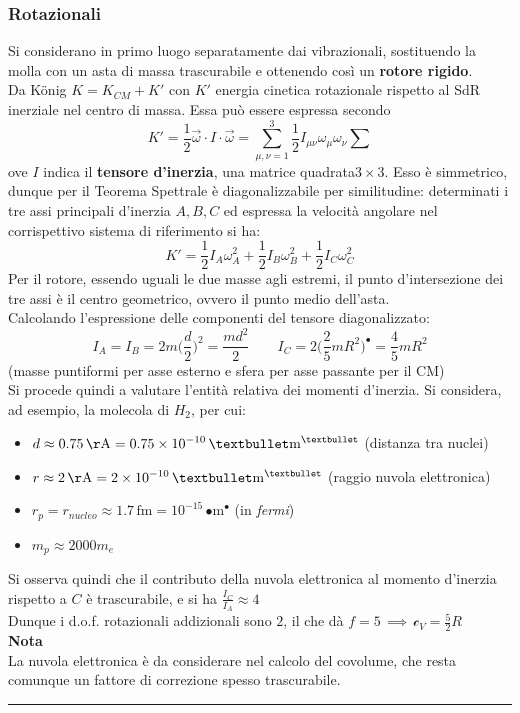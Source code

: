 \documentclass[10pt, oneside]{book}
\newcommand{\angstrom}{\, \mathrm{\AA}}
\newcommand{\meters}[2]{\, \mathrm{#2 m^{#1}}}
\newcommand{\infobox}[2]{\vspace{0.5cm}~\\ \textbf{#1} \hrulefill \vspace{0.2cm}\\#2 {}\,\\\hrule \vspace{0.5cm}}
\newcommand{\ds}{\displaystyle}
\newcommand{\molhtv}{\mathcal{c}_V }
\begin{document}
\subsubsection*{Rotazionali}
Si considerano in primo luogo separatamente dai vibrazionali, sostituendo la molla con un asta di massa trascurabile e ottenendo così un \textbf{rotore rigido}.\\
Da K\"onig $\ds K = K_{CM} + K'$ con $K'$ energia cinetica rotazionale rispetto al SdR inerziale nel centro di massa. Essa può essere espressa secondo
\[K' = \frac{1}{2} \vec{\omega} \cdot I \cdot \vec{\omega} = \sum\limits_{\mu, \nu =1}^3 \frac{1}{2} I_{\mu \nu} \omega_\mu \omega_\nu  \sum\]
ove $I$ indica il \textbf{tensore d'inerzia}, una matrice quadrata$3 \times 3$. Esso è simmetrico, dunque per il Teorema Spettrale è diagonalizzabile per similitudine: determinati i tre assi principali d'inerzia $A,B,C$ ed espressa la velocità angolare nel corrispettivo sistema di riferimento si ha:
\[K' = \frac{1}{2}I_A \omega_A^2 + \frac{1}{2}I_B \omega_B^2 + \frac{1}{2}I_C \omega_C^2\]
Per il rotore, essendo uguali le due masse agli estremi, il punto d'intersezione dei tre assi è il centro geometrico, ovvero il punto medio dell'asta. \\
Calcolando l'espressione delle componenti del tensore diagonalizzato:
\[I_A = I_B = 2 m \bigg(\frac{d}{2}\bigg)^2 = \frac{md^2}{2} \quad \quad I_C = 2 \bigg(\frac{2}{5}mR^2\bigg)^{•} = \frac{4}{5}mR^2\]
(masse puntiformi per asse esterno e sfera per asse passante per il CM)
\\
Si procede quindi a valutare l'entità relativa dei momenti d'inerzia. Si considera, ad esempio, la molecola di $H_2$, per cui:
\begin{itemize}
\item $\ds d \approx 0.75 \angstrom = 0.75 \times 10^{-10} \meters{•}{•}$ (distanza tra nuclei)
\item $\ds r \approx 2 \angstrom = 2 \times 10^{-10} \meters{•}{•}$ (raggio nuvola elettronica)
\item $\ds r_p = r_{nucleo} \approx 1.7 \, \mathrm{fm} = 10^{-15} \meters{•}{•}$ (in \textit{fermi})
\item $\ds m_p \approx 2000 m_e$
\end{itemize}
Si osserva quindi che il contributo della nuvola elettronica al momento d'inerzia rispetto a $C$ è trascurabile, e si ha $\ds \frac{I_C}{I_A} \approx 4$\textperthousand\\
Dunque i d.o.f. rotazionali addizionali sono $2$, il che dà $f= 5 \, \implies \, \molhtv = \frac{5}{2}R$
\infobox{Nota}{La nuvola elettronica è da considerare nel calcolo del covolume, che resta comunque un fattore di correzione spesso trascurabile.}
\end{document}
